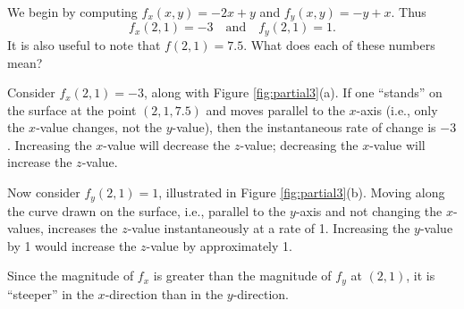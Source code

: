 {We begin by computing $f_x(x,y) = -2x+y$ and $f_y(x,y) = -y+x$. Thus
$$f_x(2,1) = -3 \quad \text{and}\quad f_y(2,1) = 1.$$
It is also useful to note that $f(2,1) = 7.5$. What does each of these numbers mean?

Consider $f_x(2,1)=-3$, along with Figure \ref{fig:partial3}(a). If one ``stands'' on the surface at the point $(2,1,7.5)$ and moves parallel to the $x$-axis (i.e., only the $x$-value changes, not the $y$-value), then the instantaneous rate of change is $-3$. Increasing the $x$-value will decrease the $z$-value; decreasing the $x$-value will increase the $z$-value.


Now consider $f_y(2,1)=1$, illustrated in Figure \ref{fig:partial3}(b). Moving along the curve drawn on the surface, i.e., parallel to the $y$-axis and not changing the $x$-values, increases the $z$-value instantaneously at a rate of 1. Increasing the $y$-value by 1 would increase the $z$-value by approximately 1.

Since the magnitude of $f_x$ is greater than the magnitude of $f_y$ at $(2,1)$, it is ``steeper'' in the $x$-direction than in the $y$-direction.
}\\


